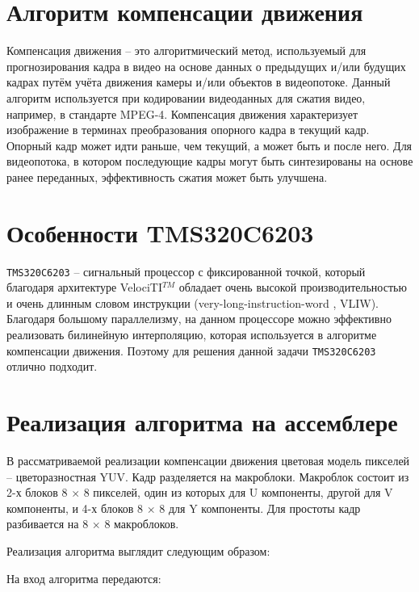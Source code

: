 





\newpage

\section{Алгоритм компенсации движения}

Компенсация движения -- это алгоритмический метод, используемый для прогнозирования кадра в видео на основе данных о предыдущих и/или будущих кадрах путём учёта движения камеры и/или объектов в видеопотоке. Данный алгоритм используется при кодировании видеоданных для сжатия видео, например, в стандарте MPEG-4. Компенсация движения характеризует изображение в терминах преобразования опорного кадра в текущий кадр. Опорный кадр может идти раньше, чем текущий, а может быть и после него. Для видеопотока, в котором последующие кадры могут быть синтезированы на основе ранее переданных, эффективность сжатия может быть улучшена.

\section{Особенности TMS320C6203}

\verb+TMS320C6203+ -- сигнальный процессор с фиксированной точкой, который благодаря архитектуре VelociTI$^{TM}$ обладает очень высокой производительностью и очень длинным словом инструкции (very-long-instruction-word
, VLIW). Благодаря большому параллелизму, на данном процессоре можно эффективно реализовать билинейную интерполяцию, которая используется в алгоритме компенсации движения. Поэтому для решения данной задачи \verb+TMS320C6203+ отлично подходит.

\section{Реализация алгоритма на ассемблере}

В рассматриваемой реализации компенсации движения цветовая модель пикселей -- цветоразностная YUV. Кадр разделяется на макроблоки. Макроблок состоит из 2-х блоков 8 $\times$ 8 пикселей, один из которых для U компоненты, другой для V компоненты, и 4-х блоков 8 $\times$ 8 для Y компоненты. Для простоты кадр разбивается на  8 $\times$ 8 макроблоков.

Реализация алгоритма выглядит следующим образом:

На вход алгоритма передаются:

